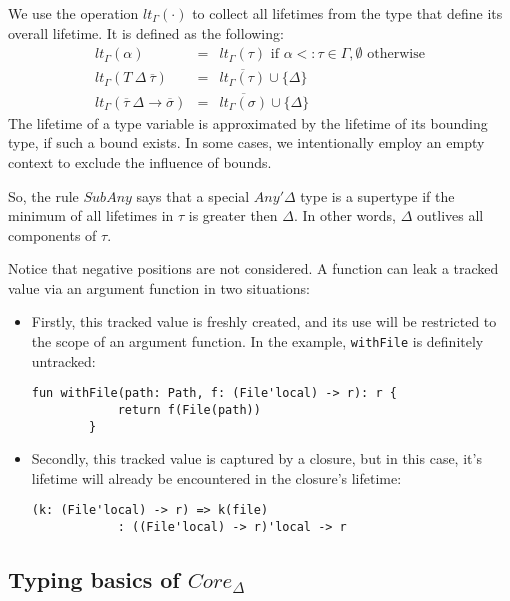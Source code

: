 \documentclass[11pt]{article}
\newcommand{\ap}{~}
\begin{document}
    We use the operation $lt_\Gamma(\cdot)$ to collect all lifetimes from the type that define its overall lifetime.
    It is defined as the following:
    \[
        \begin{array}{lll}
            lt_\Gamma(\alpha)                                     & = & lt_\Gamma(\tau) \text{ if } \alpha <: \tau \in \Gamma, \emptyset \text{ otherwise} \\
            lt_\Gamma(T\ap\Delta\ap\overline{\tau})               & = & \overline{lt_\Gamma(\tau)} \cup \{\Delta\}                                         \\
            lt_\Gamma(\overline{\tau}~\Delta\to\overline{\sigma}) & = & \overline{lt_\Gamma(\sigma)} \cup \{\Delta\}
        \end{array}
    \]
    The lifetime of a type variable is approximated by the lifetime of its bounding type, if such a bound exists.
    In some cases, we intentionally employ an empty context to exclude the influence of bounds.

    So, the rule $SubAny$ says that a special $Any'\Delta$ type is a supertype if the minimum of all lifetimes in $\tau$ is greater then $\Delta$.
    In other words, $\Delta$ outlives all components of $\tau$.

    Notice that negative positions are not considered.
    A function can leak a tracked value via an argument function in two situations:
    \begin{itemize}
        \item Firstly, this tracked value is freshly created, and its use will be restricted to the scope of an argument function.
        In the example, \lstinline[language=colang]{withFile} is definitely untracked:
        \begin{lstlisting}[language=colang]
        fun withFile(path: Path, f: (File'local) -> r): r {
            return f(File(path))
        }
        \end{lstlisting}
        \item Secondly, this tracked value is captured by a closure, but in this case, it's lifetime will already be encountered in the closure's lifetime:
        \begin{lstlisting}[language=colang]
        (k: (File'local) -> r) => k(file)
            : ((File'local) -> r)'local -> r
        \end{lstlisting}
    \end{itemize}

    \subsection{Typing basics of $Core_\Delta$}
\end{document}
